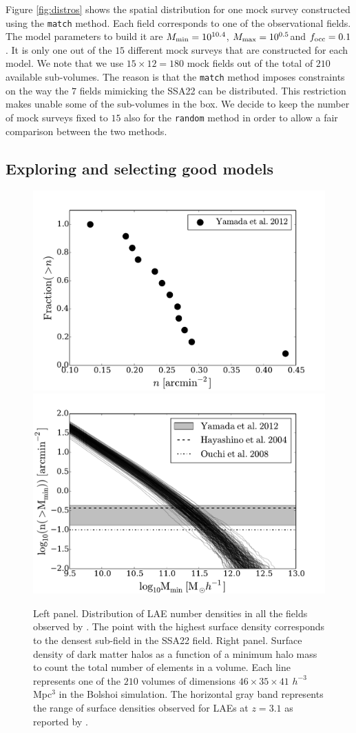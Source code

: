 \documentclass[usenatbib]{mn2e}
\newcommand{\hMsun}{{\ifmmode{h^{-1}{\rm
        {M_{\odot}}}}\else{$h^{-1}{\rm{M_{\odot}}}$}\fi}}
\begin{document}
Figure \ref{fig:distros} shows the spatial distribution for one mock
survey constructed using the {\texttt{match}} method. Each field
corresponds to one of the observational fields. The model parameters
to build it are $M_{\rm min}=10^{10.4}$\hMsun, $M_{\rm
  max}=10^{0.5}$\hMsun and $f_{\rm occ}=0.1$. It is only one out of
the $15$ different mock surveys that are constructed for each
model. We note that we use $15\times 12=180$ mock fields out of the
total of $210$ available sub-volumes. The reason is that the {\texttt{match}}
method imposes constraints on the way the $7$ fields mimicking the
SSA22 can be distributed. This restriction makes unable some of the
sub-volumes in the box. We decide to keep the number of mock surveys
fixed to $15$ also for the {\texttt{random}} method in order to allow a
fair comparison between the two methods.




\subsection{Exploring and selecting good models}


\begin{figure}
\begin{center}
\includegraphics[width=0.45\linewidth,angle=0]{Fig1b.pdf}
\includegraphics[width=0.45\linewidth,angle=0]{Fig1.pdf}
\caption{ \label{fig:halos} Left panel. Distribution of LAE number
  densities in all the fields observed by \citet{Yamada2012}. The
  point with the highest surface density corresponds to the densest
  sub-field in the SSA22 field. Right panel. Surface density of dark 
  matter halos as a function of a minimum halo mass to count the
  total number of elements in a volume. Each line represents one of the
  $210$ volumes of dimensions $46\times 35\times 41$ $h^{-3}$ Mpc$^{3}$
  in the Bolshoi simulation. The horizontal gray band represents the
  range of surface densities observed for LAEs at $z=3.1$ as reported
  by \citep{Yamada2012}.}
\end{center} 
\end{figure}
\end{document}
